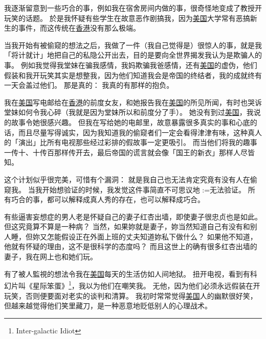 \documentclass[12pt]{report}
\makeatletter
\newcommand{\cc}[2]{#1}
\newcommand{\cc}[2]{#2}
\renewcommand{\d}[1]{$\underaccent{\scalebox{0.5}{\textbullet}}{\textrm{#1}}$}
\newcommand{\ds}[1]{%
  \@tfor\next:=#1\do{\d{\next}}}
\makeatother
\begin{document}
{{}

\cc{
我逐渐留意到一些巧合的事，例如我在宿舍房间内做的事，很奇怪地变成了教授开玩笑的话题。 於是我怀疑有些学生在故意恶作剧搞我，因为\uline{美国}大学常有恶搞新生的事件，而这传统在\uline{香港}没有那么极端。
}{
	
}

\cc{
当我开始有被偷窥的想法之后，我做了一件（我自己觉得是）很惊人的事，就是我「将计就计」地把自己的私隐公开出去，目的是要向全世界揭发我认为是欺骗人的事。  例如我觉得我堂妹在骗我感情，我妈欺骗我爸感情，还有\uline{美国}的虚伪，他们假装和我开玩笑其实是想整我，因为他们知道我会是帝国的终结者，我的成就终有一天会盖过他们。 那是真的： 我真的有那样的抱负。
}{
	
}

\cc{
我在\uline{美国}写电邮给在\uline{香港}的前度女友，和她报告我在\uline{美国}的所见所闻，有时也哭诉堂妹如何令我心碎（我就是因为堂妹所以和前度分了手）。  她没有到过\uline{美国}，我说的故事令她很感兴趣。  但我在写给她的电邮里，故意暴露很多真实的事和心底的话，而且尽量写得诚实，因为我知道我的偷窥者们一定会看得津津有味，这种真人的「演出」比所有电视那些经过彩排的假故事一定更吸引。  而当他们将我的趣事一传十、十传百那样传开去，最后帝国的谎言就会像「国王的新衣」那样人尽皆知。
}{
	
}

\cc{
这个计划似乎很完美，可惜有个漏洞： 就是我自己也无法肯定究竟有没有人在偷窥我。 当我开始想验证的时候，我发觉这件事简直不可思议地\ds{无法验证}。  所有巧合的事，都可以解释成真人秀的存在，也可以解释成巧合。
}{
	
}

\cc{
有些逼害妄想症的男人老是怀疑自己的妻子红杏出墙，即使妻子很忠贞也是如此。 但这究竟算不算是一种病？ 当然，如果妳就是妻子，妳当然知道自己有没有和别人睡，但妳又怎能假设正在外面上班的丈夫知道妳私下做什么？  如果他不知道，他就有怀疑的理由，这不是很科学的态度吗？  而且这世上的确有很多红杏出墙的妻子，我在网上也和她们玩。
}{
	
}

\cc{
有了被人監視的想法令我在\uline{美国}每天的生活仿如人间地狱。  扭开电视，看到有科幻片叫《星际笨蛋》\footnote{Inter-galactic Idiot}，我以为他们在嘲笑我。  无他，因为他们必须永远假装在开玩笑，否则便要面对老实的谈判和清算。 我初时常常觉得\uline{美国}人的幽默很好笑，但越来越觉得他们笑里藏刀，是一种恶意地贬低别人的心理战术。
}{
	
}}
\end{document}
